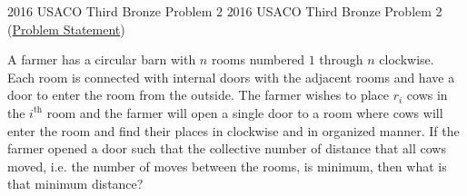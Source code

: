 \documentclass[../../main.tex]{subfiles}
\begin{document}
\begin{problem}
{2016 USACO Third Bronze Problem 2}
{2016 USACO Third Bronze Problem 2}
(\href{https://usaco.org/index.php?page=viewproblem2&cpid=616}{Problem Statement})

A farmer has a circular barn with $n$ rooms numbered $1$ through
$n$ clockwise. Each room is connected with internal doors with the
adjacent rooms and have a door to enter the room from the outside.
The farmer wishes to place $r_i$ cows in the $i^\text{th}$ room
and the farmer will open a single door to a room where cows will
enter the room and find their places in clockwise and in organized
manner. If the farmer opened a door such that the collective number of
distance that all cows moved, i.e. the number of moves between the
rooms, is minimum, then what is that minimum distance?
\end{problem}
\end{document}
